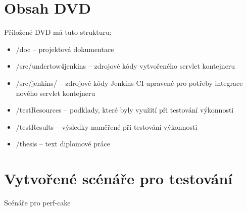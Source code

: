 
\chapter{Obsah DVD}
    Přiložené DVD má tuto strukturu:
    \begin{itemize}
        \item /doc -- projektová dokumentace
        \item /src/undertow4jenkins -- zdrojové kódy vytvořeného servlet kontejneru
        \item /src/jenkins/ -- zdrojové kódy Jenkins CI upravené pro potřeby integrace nového servlet kontejneru
        \item /testResources -- podklady, které byly využití při testování výkonnosti
        \item /testResults -- výsledky naměřené při testování výkonnosti
        \item /thesis -- text diplomové práce
    \end{itemize}

\chapter{Vytvořené scénáře pro testování} \label{prilohaScenare}
    Scénáře pro perf-cake



